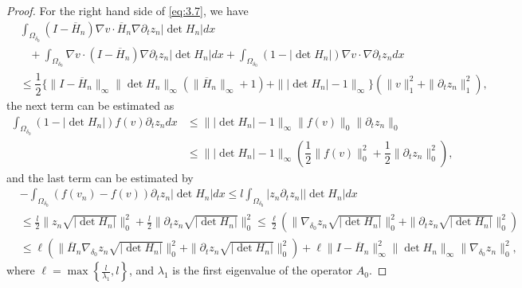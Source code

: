 \documentclass[10pt,a4paper]{amsart}
\begin{document}
\begin{proof}
For the right hand side of \eqref{eq:3.7}, we have
\begin{align*}
    &\int_{\Omega_{\delta_0}}\left(I-\overline{H}_n\right)\nabla v \cdot \overline{H}_n\nabla \partial_tz_n |\det H_n| dx \\&\;\;\;+\int_{\Omega_{\delta_0}}\nabla v \cdot (I-\overline{H}_n)\nabla  \partial_tz_n |\det H_n|dx+\int_{\Omega_{\delta_0}}(1-|\det H_n|)\nabla v\cdot \nabla \partial_tz_ndx \\
    &\leq \dfrac{1}{2}\Big\{\|I-\overline{H}_n\|_{\infty}\|\det H_n\|_{\infty}\left(\|\overline{H}_n\|_{\infty}+1\right) +\||\det H_n |-1\|_{\infty}\Big\}\left(\|v\|_1^2+\|\partial_t z_n\|_1^2\right),
\end{align*}
the next term can be estimated as
\begin{align*}
    \int_{\Omega_{\delta_0}}(1-|\det H_n|)f(v) \partial_t z_ndx & \leq \||\det H_n |-1\|_{\infty}\|f(v)\|_0\|\partial_tz_n\|_0\\
&\leq \||\det H_n |-1\|_{\infty}\left(\dfrac{1}{2}\|f(v)\|^2_0+\dfrac{1}{2}\|\partial_tz_n\|^2_0\right),
\end{align*}
and the last term can be estimated by
\begin{align*}
    &-\int_{\Omega_{\delta_0}} (f(v_n)-f(v)) \partial_t z_n|\det H_n| dx \leq l \int_{\Omega_{\delta_0}}|z_n \partial_t z_n||\det H_n|dx \\
    &\leq \frac{l}{2}\|z_n \sqrt{|\det H_n|}\|^2_0 +\frac{l}{2}\|\partial_t z_n \sqrt{|\det H_n|}\|^2_0 \leq \frac{\ell}{2}(\|\nabla_{\delta_0} z_n \sqrt{|\det H_n|}\|^2_0 +\|\partial_t z_n \sqrt{|\det H_n|}\|^2_0)\\
    &\leq \ell(\|\overline{H}_n \nabla_{\delta_0}z_n \sqrt{|\det H_n|}\|^2_0+\|\partial_t z_n \sqrt{|\det H_n|}\|^2_0)+\ell \|I - \overline{H}_n\|^2_\infty\|\det H_n\|_{\infty}\|\nabla_{\delta_0}z_n \|_0^2,
\end{align*}
where $\ell = \max\left\{\frac{l}{\lambda_1}, l\right\}$, and $\lambda_1$ is the first eigenvalue of the operator $A_0$. 



\end{proof}
\end{document}
